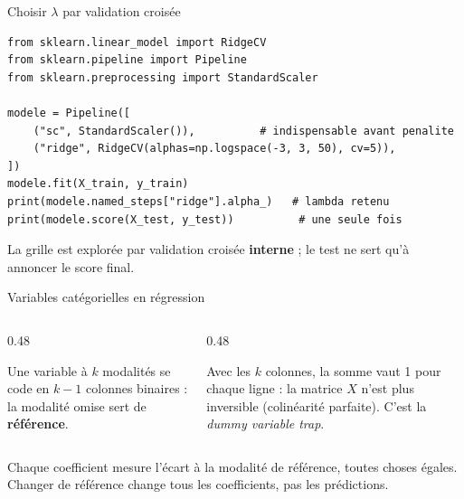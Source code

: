 \begin{frame}[fragile]{Choisir $\lambda$ par validation croisée}
\begin{codebox}
\begin{lstlisting}
from sklearn.linear_model import RidgeCV
from sklearn.pipeline import Pipeline
from sklearn.preprocessing import StandardScaler

modele = Pipeline([
    ("sc", StandardScaler()),          # indispensable avant penalite
    ("ridge", RidgeCV(alphas=np.logspace(-3, 3, 50), cv=5)),
])
modele.fit(X_train, y_train)
print(modele.named_steps["ridge"].alpha_)   # lambda retenu
print(modele.score(X_test, y_test))          # une seule fois
\end{lstlisting}
\end{codebox}
\vspace{1mm}
{\footnotesize La grille est explorée par validation croisée \textbf{interne} ;
le test ne sert qu'à annoncer le score final.}
\end{frame}

\begin{frame}{Variables catégorielles en régression}
\begin{columns}[t]
\begin{column}{0.48\textwidth}
\begin{ebox}[Le codage]
Une variable à $k$ modalités se code en $k-1$ colonnes binaires : la modalité
omise sert de \textbf{référence}.
\end{ebox}
\end{column}
\begin{column}{0.48\textwidth}
\begin{wbox}
Avec les $k$ colonnes, la somme vaut 1 pour chaque ligne : la matrice $X$ n'est
plus inversible (colinéarité parfaite). C'est la \emph{dummy variable trap}.
\end{wbox}
\end{column}
\end{columns}
\vspace{2mm}
\begin{kbox}[Lecture]
Chaque coefficient mesure l'écart à la modalité de référence, toutes choses
égales. Changer de référence change tous les coefficients, pas les prédictions.
\end{kbox}
\end{frame}

